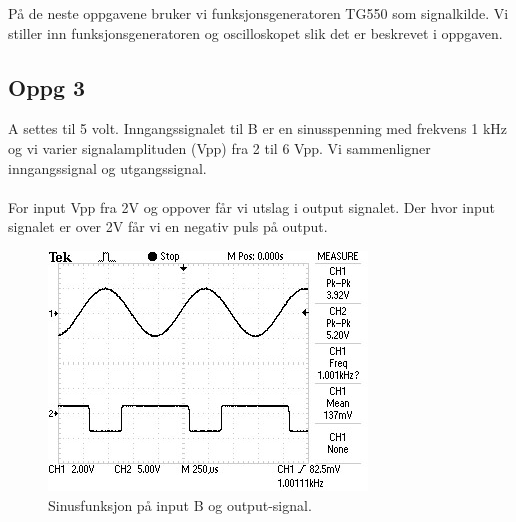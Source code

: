 På de neste oppgavene bruker vi funksjonsgeneratoren TG550 som signalkilde.
Vi stiller inn funksjonsgeneratoren og oscilloskopet slik det er
beskrevet i oppgaven.

\subsection{Oppg 3}
A settes til 5 volt.  
Inngangssignalet til B er en sinusspenning med frekvens 1 kHz og vi varier
signalamplituden (Vpp) fra 2 til 6 Vpp. 
Vi sammenligner inngangssignal og utgangssignal.
\\\\
For input Vpp fra 2V og oppover får vi utslag i output signalet.
Der hvor input signalet er over 2V får vi en negativ puls på output.
\begin{figure}[!ht]
  \caption{Sinusfunksjon på input B og output-signal.}
  \centering
    \includegraphics[width=\textwidth]{3.jpg}
\end{figure}
